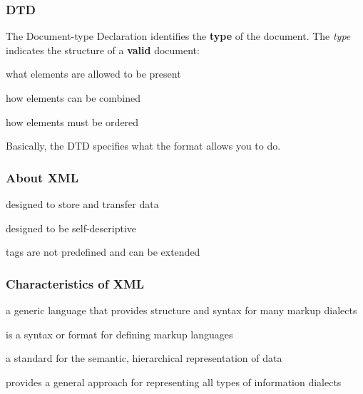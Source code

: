 \documentclass[12pt]{beamer}\usepackage[]{graphicx}\usepackage[]{color}
\begin{document}

\begin{frame}
\frametitle{DTD}

The Document-type Declaration identifies the \textbf{type} of the document. The \textit{type} indicates the structure of a \textbf{valid} document: 

\bi
 \item what elements are allowed to be present
 \item how elements can be combined
 \item how elements must be ordered
\ei
\eb

Basically, the DTD specifies what the format allows you to do.
\end{frame}


\begin{frame}
\begin{center}
\Huge{}
\end{center}
\end{frame}


\begin{frame}
\frametitle{About XML}

\bi
 \item designed to store and transfer data
 \item designed to be self-descriptive
 \item tags are not predefined and can be extended
\ei
\eb

\end{frame}


\begin{frame}
\frametitle{Characteristics of XML}

\bi
 \item a generic language that provides structure and syntax for many markup dialects
 \item is a syntax or format for defining markup languages
 \item a standard for the semantic, hierarchical representation of data
 \item provides a general approach for representing all types of information  dialects
\ei
\eb

\end{frame}
\end{document}
